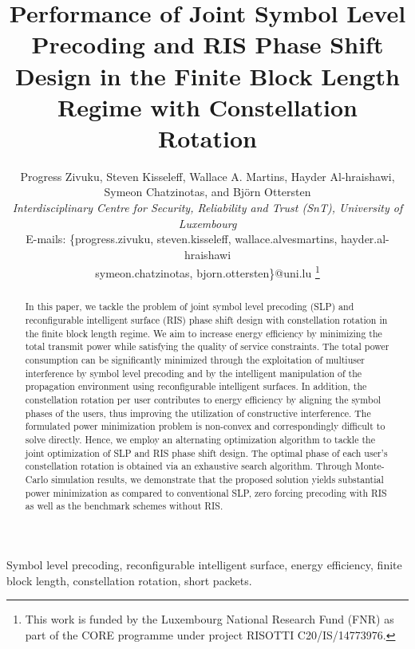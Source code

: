 \documentclass[10pt,conference]{IEEEtran}
\begin{document}
\title{\huge Performance of Joint Symbol Level Precoding and RIS Phase Shift Design in the Finite Block Length Regime with Constellation Rotation}
\author{Progress Zivuku, Steven Kisseleff, Wallace A. Martins, Hayder Al-hraishawi, \\Symeon Chatzinotas, and Bj{\"o}rn Ottersten\\
\textit{Interdisciplinary Centre for Security, Reliability and Trust (SnT), University of Luxembourg}\\ E-mails: \{progress.zivuku, steven.kisseleff, wallace.alvesmartins, hayder.al-hraishawi\\ symeon.chatzinotas, bjorn.ottersten\}@uni.lu
\thanks{This work is funded by the Luxembourg National Research Fund (FNR) as part of the CORE programme under project RISOTTI C20/IS/14773976.}
}
\maketitle

\begin{abstract}
In this paper, we tackle the problem of joint symbol level precoding (SLP) and reconfigurable intelligent surface (RIS) phase shift design with constellation rotation in the finite block length regime. We aim to increase energy efficiency by minimizing the total transmit power while satisfying the quality of service constraints. The total power consumption can be significantly minimized through the exploitation of multiuser interference by symbol level precoding and by the intelligent manipulation of the propagation environment using reconfigurable intelligent surfaces. In addition, the constellation rotation per user contributes to energy efficiency by aligning the symbol phases of the users, thus improving the utilization of constructive interference.  The formulated power minimization problem is non-convex and correspondingly difficult to solve directly. Hence, we employ an alternating optimization algorithm to tackle the joint optimization of SLP and RIS phase shift design. The optimal phase of each user's constellation rotation is obtained via an exhaustive search algorithm. Through Monte-Carlo simulation results, we demonstrate that the proposed solution yields substantial power minimization as compared to  conventional SLP, zero forcing precoding
with RIS as well as the benchmark schemes without RIS. 
\end{abstract}
\begin{IEEEkeywords}
Symbol level precoding, reconfigurable intelligent surface, energy efficiency, finite block length, constellation rotation, short packets. 
\end{IEEEkeywords} 
\end{document}
